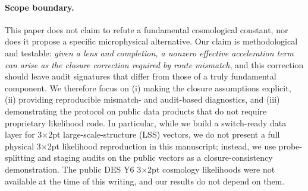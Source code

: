 \documentclass[11pt]{article}
\theoremstyle{definition}
\theoremstyle{plain}
\theoremstyle{remark}
\begin{document}
\paragraph{Scope boundary.}
This paper does not claim to refute a fundamental cosmological constant, nor does it propose a specific microphysical alternative. Our claim is methodological and testable: \emph{given a lens and completion, a nonzero effective acceleration term can arise as the closure correction required by route mismatch}, and this correction should leave audit signatures that differ from those of a truly fundamental component. We therefore focus on (i) making the closure assumptions explicit, (ii) providing reproducible mismatch- and audit-based diagnostics, and (iii) demonstrating the protocol on public data products that do not require proprietary likelihood code. In particular, while we build a switch-ready data layer for 3$\times$2pt large-scale-structure (LSS) vectors, we do not present a full physical 3$\times$2pt likelihood reproduction in this manuscript; instead, we use probe-splitting and staging audits on the public vectors as a closure-consistency demonstration. The public DES Y6 3$\times$2pt cosmology likelihoods were not available at the time of this writing, and our results do not depend on them.
\end{document}

